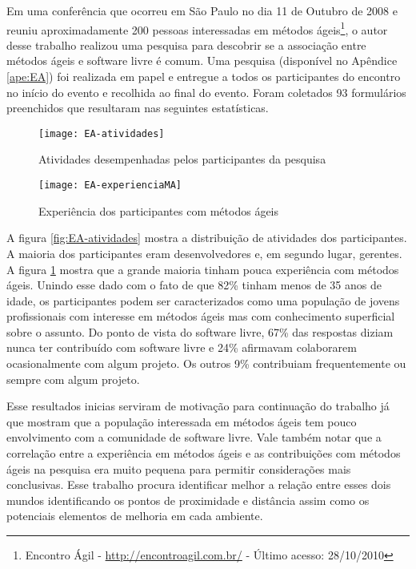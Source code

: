 Em uma conferência que ocorreu em São Paulo no dia 11 de Outubro de
2008 e reuniu aproximadamente 200 pessoas interessadas em métodos
ágeis\footnote{Encontro Ágil - \url{http://encontroagil.com.br/} -
  Último acesso: 28/10/2010}, o autor desse trabalho realizou uma
pesquisa para descobrir se a associação entre métodos ágeis e software
livre é comum. Uma pesquisa (disponível no Apêndice \ref{ape:EA}) foi
realizada em papel e entregue a todos os participantes do encontro no
início do evento e recolhida ao final do evento. Foram coletados 93
formulários preenchidos que resultaram nas seguintes estatísticas.

\begin{figure}[htb]
  \begin{minipage}[t]{0.5\linewidth}
    \centering
    \texttt{[image: EA-atividades]}
    \caption{Atividades desempenhadas pelos participantes da pesquisa}
    \label{fig:EA-atividades}
  \end{minipage}
  \begin{minipage}[t]{0.5\linewidth}
    \centering
    \texttt{[image: EA-experienciaMA]}
    \caption{Experiência dos participantes com métodos ágeis}
    \label{fig:EA-experienciaMA}
  \end{minipage}
\end{figure}

A figura \ref{fig:EA-atividades} mostra a distribuição de atividades
dos participantes. A maioria dos participantes eram desenvolvedores e,
em segundo lugar, gerentes. A figura \ref{fig:EA-experienciaMA} mostra
que a grande maioria tinham pouca experiência com métodos
ágeis. Unindo esse dado com o fato de que 82\% tinham menos de 35 anos
de idade, os participantes podem ser caracterizados como uma população
de jovens profissionais com interesse em métodos ágeis mas com
conhecimento superficial sobre o assunto. Do ponto de vista do
software livre, 67\% das respostas diziam nunca ter contribuído com
software livre e 24\% afirmavam colaborarem ocasionalmente com algum
projeto. Os outros 9\% contribuiam frequentemente ou sempre com algum
projeto.

Esse resultados inicias serviram de motivação para continuação do
trabalho já que mostram que a população interessada em métodos ágeis
tem pouco envolvimento com a comunidade de software livre. Vale também
notar que a correlação entre a experiência em métodos ágeis e as
contribuições com métodos ágeis na pesquisa era muito pequena para
permitir considerações mais conclusivas. Esse trabalho procura
identificar melhor a relação entre esses dois mundos identificando os
pontos de proximidade e distância assim como os potenciais elementos
de melhoria em cada ambiente.

